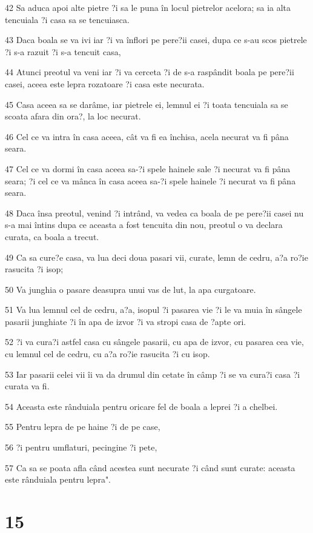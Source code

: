 \par 42 Sa aduca apoi alte pietre ?i sa le puna în locul pietrelor acelora; sa ia alta tencuiala ?i casa sa se tencuiasca.
\par 43 Daca boala se va ivi iar ?i va înflori pe pere?ii casei, dupa ce s-au scos pietrele ?i s-a razuit ?i s-a tencuit casa,
\par 44 Atunci preotul va veni iar ?i va cerceta ?i de s-a raspândit boala pe pere?ii casei, aceea este lepra rozatoare ?i casa este necurata.
\par 45 Casa aceea sa se darâme, iar pietrele ei, lemnul ei ?i toata tencuiala sa se scoata afara din ora?, la loc necurat.
\par 46 Cel ce va intra în casa aceea, cât va fi ea închisa, acela necurat va fi pâna seara.
\par 47 Cel ce va dormi în casa aceea sa-?i spele hainele sale ?i necurat va fi pâna seara; ?i cel ce va mânca în casa aceea sa-?i spele hainele ?i necurat va fi pâna seara.
\par 48 Daca însa preotul, venind ?i intrând, va vedea ca boala de pe pere?ii casei nu s-a mai întins dupa ce aceasta a fost tencuita din nou, preotul o va declara curata, ca boala a trecut.
\par 49 Ca sa cure?e casa, va lua deci doua pasari vii, curate, lemn de cedru, a?a ro?ie rasucita ?i isop;
\par 50 Va junghia o pasare deasupra unui vas de lut, la apa curgatoare.
\par 51 Va lua lemnul cel de cedru, a?a, isopul ?i pasarea vie ?i le va muia în sângele pasarii junghiate ?i în apa de izvor ?i va stropi casa de ?apte ori.
\par 52 ?i va cura?i astfel casa cu sângele pasarii, cu apa de izvor, cu pasarea cea vie, cu lemnul cel de cedru, cu a?a ro?ie rasucita ?i cu isop.
\par 53 Iar pasarii celei vii îi va da drumul din cetate în câmp ?i se va cura?i casa ?i curata va fi.
\par 54 Aceasta este rânduiala pentru oricare fel de boala a leprei ?i a chelbei.
\par 55 Pentru lepra de pe haine ?i de pe case,
\par 56 ?i pentru umflaturi, pecingine ?i pete,
\par 57 Ca sa se poata afla când acestea sunt necurate ?i când sunt curate: aceasta este rânduiala pentru lepra".

\chapter{15}

